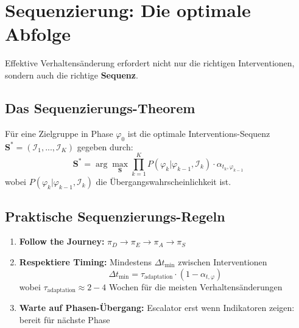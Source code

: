 \section{Sequenzierung: Die optimale Abfolge}
\label{sec:18-sequence}

Effektive Verhaltensänderung erfordert nicht nur die richtigen Interventionen, sondern auch die richtige \textbf{Sequenz}.

\subsection{Das Sequenzierungs-Theorem}

\begin{theorem}
\label{thm:18-sequence}
Für eine Zielgruppe in Phase $\varphi_0$ ist die optimale Interventions-Sequenz $\mathbf{S}^* = (\mathcal{I}_1, ..., \mathcal{I}_K)$ gegeben durch:
\begin{equation}
\mathbf{S}^* = \arg\max_{\mathbf{S}} \prod_{k=1}^{K} P(\varphi_{k} | \varphi_{k-1}, \mathcal{I}_k) \cdot \alpha_{t_k, \varphi_{k-1}}
\label{eq:18-optimal-sequence}
\end{equation}
wobei $P(\varphi_{k} | \varphi_{k-1}, \mathcal{I}_k)$ die Übergangswahrscheinlichkeit ist.
\end{theorem}

\subsection{Praktische Sequenzierungs-Regeln}

\begin{enumerate}
\item \textbf{Follow the Journey:} $\pi_D \rightarrow \pi_E \rightarrow \pi_A \rightarrow \pi_S$
\item \textbf{Respektiere Timing:} Mindestens $\Delta t_{\min}$ zwischen Interventionen
\begin{equation}
\Delta t_{\min} = \tau_{\text{adaptation}} \cdot (1 - \alpha_{t,\varphi})
\label{eq:18-timing-rule}
\end{equation}
wobei $\tau_{\text{adaptation}} \approx 2{-}4$ Wochen für die meisten Verhaltensänderungen

\item \textbf{Warte auf Phasen-Übergang:} Escalator erst wenn Indikatoren zeigen: bereit für nächste Phase
\end{enumerate}


